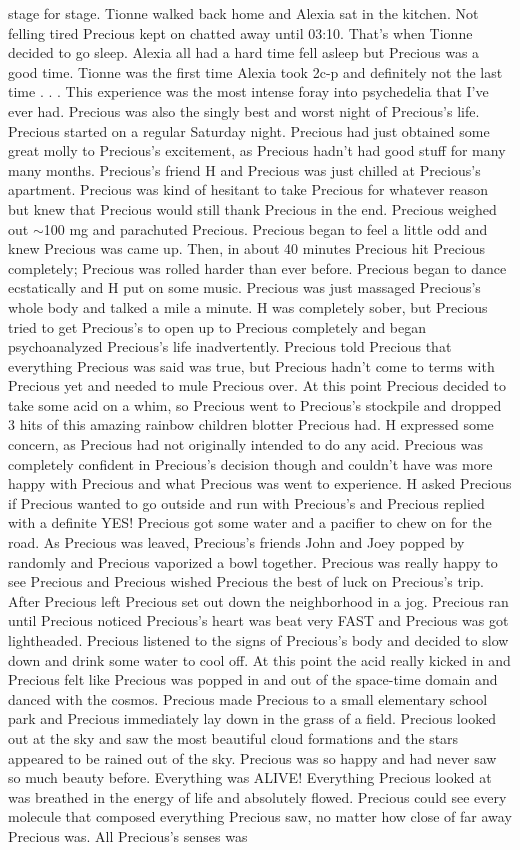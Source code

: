 \documentclass[12pt]{book}
\begin{document}
stage for stage. Tionne walked back home and Alexia sat in the kitchen. Not felling tired Precious kept on chatted away until 03:10. That's when Tionne decided to go sleep. Alexia all had a hard time fell asleep but Precious was a good time. Tionne was the first time Alexia took 2c-p and definitely not the last time . . . This experience was the most intense foray into psychedelia that I've ever had. Precious was also the singly best and worst night of Precious's life. Precious started on a regular Saturday night. Precious had just obtained some great molly to Precious's excitement, as Precious hadn't had good stuff for many many months. Precious's friend H and Precious was just chilled at Precious's apartment. Precious was kind of hesitant to take Precious for whatever reason but knew that Precious would still thank Precious in the end. Precious weighed out $\sim$100 mg and parachuted Precious. Precious began to feel a little odd and knew Precious was came up. Then, in about 40 minutes Precious hit Precious completely; Precious was rolled harder than ever before. Precious began to dance ecstatically and H put on some music. Precious was just massaged Precious's whole body and talked a mile a minute. H was completely sober, but Precious tried to get Precious's to open up to Precious completely and began psychoanalyzed Precious's life inadvertently. Precious told Precious that everything Precious was said was true, but Precious hadn't come to terms with Precious yet and needed to mule Precious over. At this point Precious decided to take some acid on a whim, so Precious went to Precious's stockpile and dropped 3 hits of this amazing rainbow children blotter Precious had. H expressed some concern, as Precious had not originally intended to do any acid. Precious was completely confident in Precious's decision though and couldn't have was more happy with Precious and what Precious was went to experience. H asked Precious if Precious wanted to go outside and run with Precious's and Precious replied with a definite YES! Precious got some water and a pacifier to chew on for the road. As Precious was leaved, Precious's friends John and Joey popped by randomly and Precious vaporized a bowl together. Precious was really happy to see Precious and Precious wished Precious the best of luck on Precious's trip. After Precious left Precious set out down the neighborhood in a jog. Precious ran until Precious noticed Precious's heart was beat very FAST and Precious was got lightheaded. Precious listened to the signs of Precious's body and decided to slow down and drink some water to cool off. At this point the acid really kicked in and Precious felt like Precious was popped in and out of the space-time domain and danced with the cosmos. Precious made Precious to a small elementary school park and Precious immediately lay down in the grass of a field. Precious looked out at the sky and saw the most beautiful cloud formations and the stars appeared to be rained out of the sky. Precious was so happy and had never saw so much beauty before. Everything was ALIVE! Everything Precious looked at was breathed in the energy of life and absolutely flowed. Precious could see every molecule that composed everything Precious saw, no matter how close of far away Precious was. All Precious's senses was 
\end{document}
